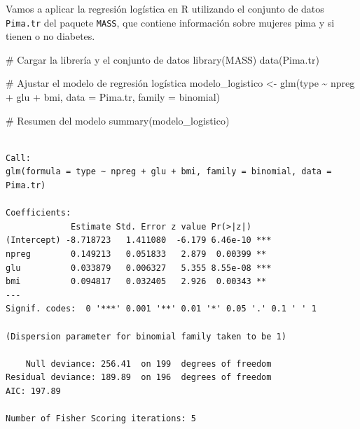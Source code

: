 \documentclass[
  letterpaper,
  DIV=11,
  numbers=noendperiod]{scrreprt}
\newenvironment{Shaded}{\begin{snugshade}}{\end{snugshade}}
\newcommand{\AttributeTok}[1]{\textcolor[rgb]{0.40,0.45,0.13}{#1}}
\newcommand{\CommentTok}[1]{\textcolor[rgb]{0.37,0.37,0.37}{#1}}
\newcommand{\FunctionTok}[1]{\textcolor[rgb]{0.28,0.35,0.67}{#1}}
\newcommand{\NormalTok}[1]{\textcolor[rgb]{0.00,0.23,0.31}{#1}}
\newcommand{\OtherTok}[1]{\textcolor[rgb]{0.00,0.23,0.31}{#1}}
\newcommand{\SpecialCharTok}[1]{\textcolor[rgb]{0.37,0.37,0.37}{#1}}
\begin{document}
\begin{tcolorbox}[enhanced jigsaw, breakable, toprule=.15mm, bottomtitle=1mm, coltitle=black, colbacktitle=quarto-callout-tip-color!10!white, titlerule=0mm, opacitybacktitle=0.6, bottomrule=.15mm, toptitle=1mm, title=\textcolor{quarto-callout-tip-color}{\faLightbulb}\hspace{0.5em}{Ejemplo}, arc=.35mm, rightrule=.15mm, opacityback=0, colframe=quarto-callout-tip-color-frame, leftrule=.75mm, left=2mm, colback=white]

Vamos a aplicar la regresión logística en R utilizando el conjunto de
datos \texttt{Pima.tr} del paquete \texttt{MASS}, que contiene
información sobre mujeres pima y si tienen o no diabetes.

\begin{Shaded}
\begin{Highlighting}[]
\CommentTok{\# Cargar la librería y el conjunto de datos}
\FunctionTok{library}\NormalTok{(MASS)}
\FunctionTok{data}\NormalTok{(Pima.tr)}

\CommentTok{\# Ajustar el modelo de regresión logística}
\NormalTok{modelo\_logistico }\OtherTok{\textless{}{-}} \FunctionTok{glm}\NormalTok{(type }\SpecialCharTok{\textasciitilde{}}\NormalTok{ npreg }\SpecialCharTok{+}\NormalTok{ glu }\SpecialCharTok{+}\NormalTok{ bmi, }\AttributeTok{data =}\NormalTok{ Pima.tr, }\AttributeTok{family =}\NormalTok{ binomial)}

\CommentTok{\# Resumen del modelo}
\FunctionTok{summary}\NormalTok{(modelo\_logistico)}
\end{Highlighting}
\end{Shaded}

\begin{verbatim}

Call:
glm(formula = type ~ npreg + glu + bmi, family = binomial, data = Pima.tr)

Coefficients:
             Estimate Std. Error z value Pr(>|z|)    
(Intercept) -8.718723   1.411080  -6.179 6.46e-10 ***
npreg        0.149213   0.051833   2.879  0.00399 ** 
glu          0.033879   0.006327   5.355 8.55e-08 ***
bmi          0.094817   0.032405   2.926  0.00343 ** 
---
Signif. codes:  0 '***' 0.001 '**' 0.01 '*' 0.05 '.' 0.1 ' ' 1

(Dispersion parameter for binomial family taken to be 1)

    Null deviance: 256.41  on 199  degrees of freedom
Residual deviance: 189.89  on 196  degrees of freedom
AIC: 197.89

Number of Fisher Scoring iterations: 5
\end{verbatim}


\end{tcolorbox}
\end{document}
